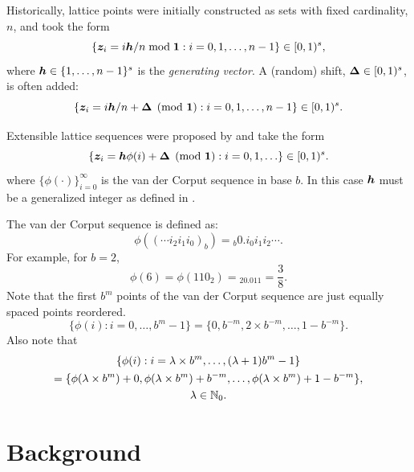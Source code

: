 \documentclass[authoryear]{elsarticle}
\begin{document}
Historically, lattice points were initially constructed as sets with fixed cardinality, $n$, and took the form
\begin{equation} \label{eq:lat}
    \{\boldsymbol{z}_i = i \boldsymbol{h}/n \bmod{\boldsymbol{1}} : i=0,1, \ldots, n-1 \} \in [0,1)^s,
\end{equation}
where $\boldsymbol{h} \in \{1, \ldots, n-1\}^s$ is the \emph{generating vector}.  A (random) shift, $\boldsymbol{\Delta} \in [0,1)^s$, is often added:
\begin{equation} \label{eq:shlat}
    \{\boldsymbol{z}_i = i \boldsymbol{h}/n + \boldsymbol{\Delta} \pmod{\boldsymbol{1}} : i=0,1, \ldots, n-1 \} \in [0,1)^s.
\end{equation}




Extensible lattice sequences were proposed by \cite{HicEtal00,Mai81a} and take the form
\begin{equation} \label{eq:extlat}
    \{\boldsymbol{z}_i = \boldsymbol{h}\phi(i)+ \boldsymbol{\Delta} \pmod{\boldsymbol{1}} : i=0,1, \ldots \} \in [0,1)^s.
\end{equation}
where $\{\phi(\cdot)\}_{i=0}^\infty$ is the van der Corput sequence in base $b$.  In this case $\boldsymbol{h}$ must be a generalized integer as defined in \cite[Section 2]{HicNie03a}.

The van der Corput sequence is defined as: 
\[
\phi((\cdots i_2 i_1 i_0)_b) = {}_b0.i_0 i_1 i_2 \cdots.
\]
For example, for $b=2$,
\[
\phi(6) = \phi(110_2) = {}_20.011 = \frac 38.
\]
Note that the first ${b^m}$ points of the van der Corput sequence are just equally spaced points reordered. 
\begin{equation} \label{eq:phipropone}
\{ \phi(i) : i = 0, \ldots, b^m-1 \} = \{0, b^{-m}, 2\times b^{-m}, \ldots, 1 - b^{-m} \}.
\end{equation}
Also note that
\begin{multline} \label{eq:phiproptwo}
\{ \phi(i) : i = \lambda \times b^m , \ldots, (\lambda+1)b^m-1 \} \\
= \{\phi(\lambda \times b^m) + 0, \phi(\lambda \times b^m) + b^{-m}, \ldots, \phi(\lambda \times b^m) + 1 - b^{-m} \} , \\
\lambda \in \mathbb{N}_{0}.
\end{multline}

\section{Background}
\end{document}
